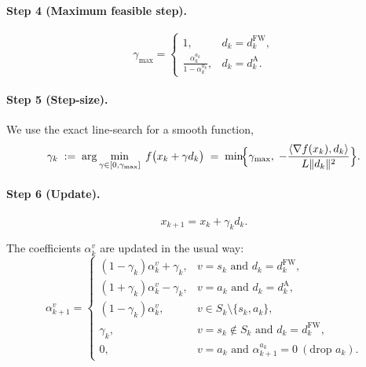 \documentclass{article}
\begin{document}
\paragraph{Step 4 (Maximum feasible step).}
\[
\gamma_{\max }=
\begin{cases}
1, & d_{k}=d^{\mathrm{FW}}_{k},\\[4pt]
\displaystyle\frac{\alpha_{k}^{a_{k}}}{1-\alpha_{k}^{a_{k}}}, & d_{k}=d^{\mathrm{A}}_{k}.
\end{cases}
\]

\paragraph{Step 5 (Step‑size).}  We use the exact line‑search for a smooth function,
\[
\gamma_{k}\;:=\;\arg\min_{\gamma\in[0,\gamma_{\max}]}\; f\bigl(x_{k}+ \gamma d_{k}\bigr)
      \;=\;\min\!\Bigl\{\gamma_{\max},\;
          -\frac{\langle \nabla f(x_{k}),d_{k}\rangle}{L\|d_{k}\|^{2}}\Bigr\}.
\]

\paragraph{Step 6 (Update).}
\[
x_{k+1}=x_{k}+ \gamma_{k}d_{k}.
\]

The coefficients $\alpha_{k}^{v}$ are updated in the usual way:
\[
\alpha_{k+1}^{v}= 
\begin{cases}
(1-\gamma_{k})\alpha_{k}^{v}+\gamma_{k}, & v=s_{k}\text{ and }d_{k}=d^{\mathrm{FW}}_{k},\\[4pt]
(1+\gamma_{k})\alpha_{k}^{v}-\gamma_{k}, & v=a_{k}\text{ and }d_{k}=d^{\mathrm{A}}_{k},\\[4pt]
(1-\gamma_{k})\alpha_{k}^{v}, & v\in S_{k}\setminus\{s_{k},a_{k}\},\\[4pt]
\gamma_{k}, & v=s_{k}\notin S_{k}\text{ and }d_{k}=d^{\mathrm{FW}}_{k},\\[4pt]
0, & v=a_{k}\text{ and }\alpha_{k+1}^{a_{k}}=0\ (\text{drop }a_{k}).
\end{cases}
\]
\end{document}

